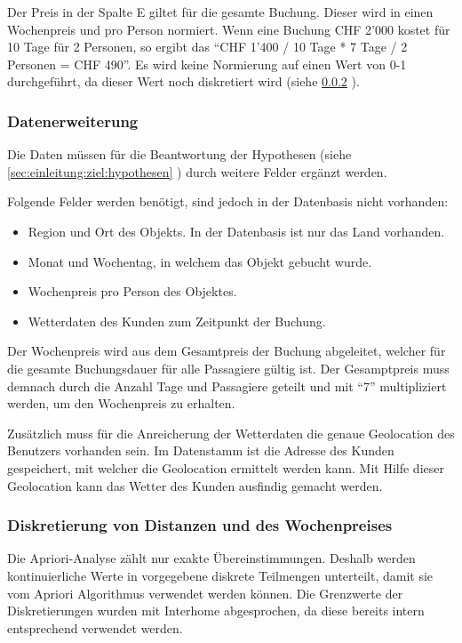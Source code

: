 Der Preis in der Spalte E giltet für die gesamte Buchung. Dieser wird in einen Wochenpreis und pro Person normiert. Wenn eine Buchung CHF 2'000 kostet für 10 Tage für 2 Personen, so ergibt das "`CHF 1'400 / 10 Tage * 7 Tage / 2 Personen = CHF 490"'. Es wird keine Normierung auf einen Wert von 0-1 durchgeführt, da dieser Wert noch diskretiert wird (siehe \cref{sec:recherche:datenvorbereitung:diskretierung} ).

\subsubsection{Datenerweiterung} 
Die Daten müssen für die Beantwortung der Hypothesen (siehe \cref{sec:einleitung:ziel:hypothesen} ) durch weitere Felder ergänzt werden. 

Folgende Felder werden benötigt, sind jedoch in der Datenbasis nicht vorhanden:
\begin{itemize}
\item Region und Ort des Objekts. In der Datenbasis ist nur das Land vorhanden.
\item Monat und Wochentag, in welchem das Objekt gebucht wurde. 
\item Wochenpreis pro Person des Objektes.
\item Wetterdaten des Kunden zum Zeitpunkt der Buchung.
\end{itemize}

Der Wochenpreis wird aus dem Gesamtpreis der Buchung abgeleitet, welcher für die gesamte Buchungsdauer für alle Passagiere gültig ist. Der Gesamptpreis muss demnach durch die Anzahl Tage und Passagiere geteilt und mit "`7"' multipliziert werden, um den Wochenpreis zu erhalten.

Zusätzlich muss für die Anreicherung der Wetterdaten die genaue Geolocation des Benutzers vorhanden sein. Im Datenstamm ist die Adresse des Kunden gespeichert, mit welcher die Geolocation ermittelt werden kann. Mit Hilfe dieser Geolocation kann das Wetter des Kunden ausfindig gemacht werden.

\subsubsection{Diskretierung von Distanzen und des Wochenpreises} 
\label{sec:recherche:datenvorbereitung:diskretierung}
Die Apriori-Analyse zählt nur exakte Übereinstimmungen. Deshalb werden kontinuierliche Werte in vorgegebene diskrete Teilmengen unterteilt, damit sie vom Apriori Algorithmus verwendet werden können. Die Grenzwerte der Diskretierungen wurden mit Interhome abgesprochen, da diese bereits intern entsprechend verwendet werden.


